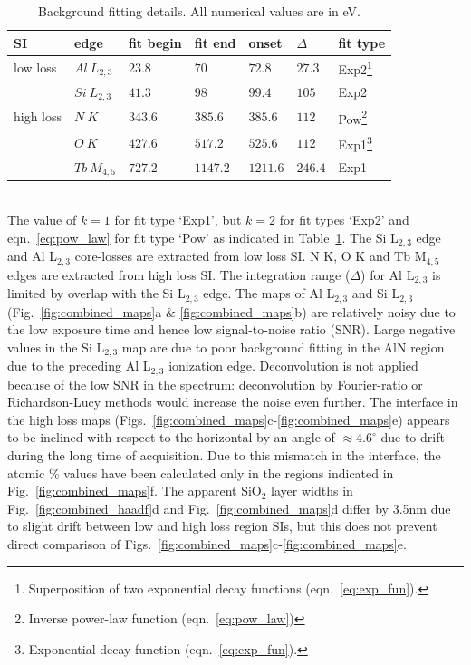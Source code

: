 \documentclass[%
aip,
rsi,%
 amsmath,amssymb,%
 reprint,%
]{revtex4-1}
\begin{document}
\begin{table}%
	\caption{Background fitting details. All numerical values are in eV.}
    \label{tab:back_fit_table}
    \begin{ruledtabular}
    	\begin{tabular}{lllllll}
    		SI	&edge	 &fit begin&fit end&onset&$\Delta$&fit type 	\\ \hline
            low loss&$Al~L_{2,3}$& $23.8$&$70$&$72.8$&$27.3$&Exp2\footnote{Superposition of two exponential decay functions (eqn.~\ref{eq:exp_fun}).} 		\\
            		&$Si~L_{2,3}$&$41.3$&$98$&$99.4$&$105$&Exp2 			\\ \hline
            high loss&$N~K$&$343.6$&$385.6$&$385.6$&$112$&Pow\footnote{Inverse power-law function (eqn.~\ref{eq:pow_law})} 			\\
                	&$O~K$&$427.6$&$517.2$&$525.6$&$112$&Exp1\footnote{Exponential decay function (eqn.~\ref{eq:exp_fun}).} 			\\
            		&$Tb~M_{4,5}$&$727.2$&$1147.2$&$1211.6$&$246.4$&Exp1 	\\
    	\end{tabular}
    \end{ruledtabular}
\end{table}\\
The value of $k = 1$ for fit type \lq{Exp1}\rq{}, but $k = 2$ for fit types \lq{Exp2}\rq{} and eqn.~\ref{eq:pow_law} for fit type \lq{Pow}\rq{} as indicated in Table~\ref{tab:back_fit_table}. The Si L$_{2,3}$ edge and Al L$_{2,3}$ core-losses are extracted from low loss SI. N K, O K and Tb M$_{4,5}$ edges are extracted from high loss SI. The integration range ($\Delta$) for Al L$_{2,3}$ is limited by overlap with the Si L$_{2,3}$ edge. The maps of Al L$_{2,3}$ and Si L$_{2,3}$ (Fig.~\ref{fig:combined_maps}a \& \ref{fig:combined_maps}b) are relatively noisy due to the low exposure time and hence low signal-to-noise ratio (SNR). Large negative values in the Si L$_{2,3}$ map are due to poor background fitting in the AlN region due to the preceding Al L$_{2,3}$ ionization edge. Deconvolution is not applied because of the low SNR in the spectrum: deconvolution by Fourier-ratio or Richardson-Lucy methods would increase the noise even further. The interface in the high loss maps (Figs.~\ref{fig:combined_maps}c-\ref{fig:combined_maps}e) appears to be inclined with respect to the horizontal by an angle of $\approx4.6^\circ$ due to drift during the long time of acquisition. Due to this mismatch in the interface, the atomic \% values have been calculated only in the regions indicated in Fig.~\ref{fig:combined_maps}f. The apparent SiO$_2$ layer widths in Fig.~\ref{fig:combined_haadf}d and Fig.~\ref{fig:combined_maps}d differ by 3.5nm due to slight drift between low and high loss region SIs, but this does not prevent direct comparison of Figs.~\ref{fig:combined_maps}c-\ref{fig:combined_maps}e.
\end{document}
